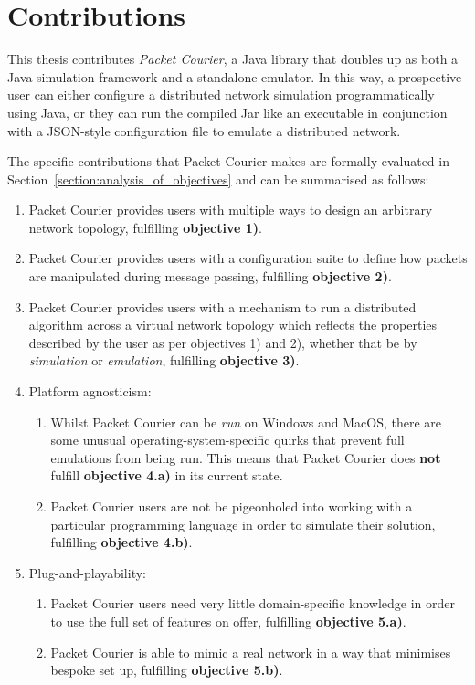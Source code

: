 \section{Contributions}\label{section:contributions}

This thesis contributes \emph{Packet Courier}, a Java library that doubles up as both a Java simulation framework and
a standalone emulator. In this way, a prospective user can either configure a distributed network simulation
programmatically using Java, or they can run the compiled Jar like an executable in conjunction with a JSON-style
configuration file to emulate a distributed network.

The specific contributions that Packet Courier makes are formally evaluated in
Section~\ref{section:analysis_of_objectives} and can be summarised as follows:
\begin{enumerate}
    \item Packet Courier provides users with multiple ways to design an arbitrary network topology, fulfilling
    \textbf{objective 1)}.
    \item Packet Courier provides users with a configuration suite to define how packets are manipulated during
    message passing, fulfilling \textbf{objective 2)}.
    \item Packet Courier provides users with a mechanism to run a distributed algorithm across a virtual network
    topology which reflects the properties described by the user as per objectives 1) and 2), whether that be by
    \emph{simulation} or \emph{emulation}, fulfilling \textbf{objective 3)}.
    \item Platform agnosticism:
    \begin{enumerate}
        \item Whilst Packet Courier can be \emph{run} on Windows and MacOS, there are some unusual
        operating-system-specific quirks that prevent full emulations from being run. This means that Packet Courier
        does \textbf{not} fulfill \textbf{objective 4.a)} in its current state.
        \item Packet Courier users are not be pigeonholed into working with a particular programming language in
        order to simulate their solution, fulfilling \textbf{objective 4.b)}.
    \end{enumerate}
    \item Plug-and-playability:
    \begin{enumerate}
        \item Packet Courier users need very little domain-specific knowledge in order to use the full set of
        features on offer, fulfilling \textbf{objective 5.a)}.
        \item Packet Courier is able to mimic a real network in a way that minimises bespoke set up, fulfilling
        \textbf{objective 5.b)}.
    \end{enumerate}
\end{enumerate}
